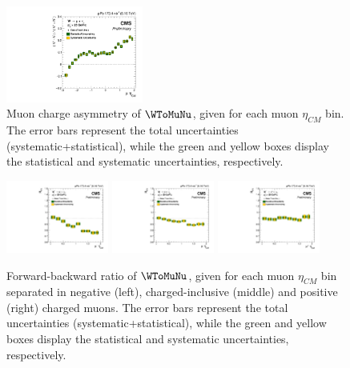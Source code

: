 \begin{figure}[!htbp]
 \begin{center}
  \includegraphics[width=0.40\textwidth]{Figures/WBoson/Analysis/Systematics/Nominal/PA/Charge_Asymmetry/gr_WToMuInc_PA_Charge_Asymmetry_EffTnP_Nominal.pdf}
 \end{center}
 \caption{Muon charge asymmetry of $\WToMuNu$, given for each muon $\eta_{CM}$ bin. The error bars represent the total uncertainties (systematic+statistical), while the green and yellow boxes display the statistical and systematic uncertainties, respectively. }
 \label{fig:ChargeAsymmetrySyst_WToMu_PA}
\end{figure}


\begin{figure}[!htbp]
 \begin{center}
  \includegraphics[width=0.30\textwidth]{Figures/WBoson/Analysis/Systematics/Nominal/PA/ForwardBackward_Ratio/gr_WToMuMi_PA_ForwardBackward_Ratio_EffTnP_Nominal}
  \includegraphics[width=0.30\textwidth]{Figures/WBoson/Analysis/Systematics/Nominal/PA/ForwardBackward_Ratio/gr_WToMuInc_PA_ForwardBackward_Ratio_EffTnP_Nominal}
  \includegraphics[width=0.30\textwidth]{Figures/WBoson/Analysis/Systematics/Nominal/PA/ForwardBackward_Ratio/gr_WToMuPl_PA_ForwardBackward_Ratio_EffTnP_Nominal}
 \end{center}
 \caption{Forward-backward ratio of $\WToMuNu$, given for each muon $\eta_{CM}$ bin separated in negative (left), charged-inclusive (middle) and positive (right) charged muons. The error bars represent the total uncertainties (systematic+statistical), while the green and yellow boxes display the statistical and systematic uncertainties, respectively. }
 \label{fig:ForwardBackwardRatioSyst_WToMu_PA}
\end{figure}


